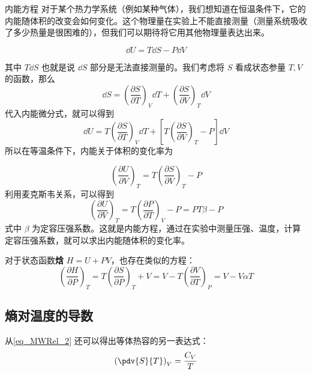 \begin{example}{内能方程}
对于某个热力学系统（例如某种气体），我们想知道在恒温条件下，它的内能随体积的改变会如何变化。这个物理量在实验上不能直接测量（测量系统吸收了多少热量是很困难的），但我们可以期待将它用其他物理量表达出来。

\begin{equation}
\dd U=T\dd S-P\dd V
\end{equation}

其中 $T\dd S$ 也就是说 $\dd S$ 部分是无法直接测量的。我们考虑将 $S$ 看成状态参量 $T,V$ 的函数，那么 
\begin{equation}
\dd S=\left(\frac{\partial S}{\partial T}\right)_V \dd T+\left(\frac{\partial S}{\partial V}\right)_T \dd V
\end{equation}
代入内能微分式，就可以得到
\begin{equation}\label{eq_MWRel_2}
\dd U=T\left(\frac{\partial S}{\partial T}\right)_V\dd T+\left[T\left(\frac{\partial S}{\partial V}\right)_T-P\right]\dd V
\end{equation}
所以在等温条件下，内能关于体积的变化率为

\begin{equation}
\left(\frac{\partial U}{\partial V}\right)_T=T\left(\frac{\partial S}{\partial V}\right)_T-P
\end{equation}
利用麦克斯韦关系，可以得到
\begin{equation}
\left(\frac{\partial U}{\partial V}\right)_T=T\left(\frac{\partial P}{\partial T}\right)_V-P=PT\beta-P
\end{equation}
式中 $\beta$ 为定容压强系数。这就是内能方程，通过在实验中测量压强、温度，计算定容压强系数，就可以求出内能随体积的变化率。

对于状态函数\textbf{焓} $H=U+PV$，也存在类似的方程：
\begin{equation}\label{eq_MWRel_3}
\left(\frac{\partial H}{\partial P}\right)_T=T\left(\frac{\partial S}{\partial P}\right)_T+V
=V-T\left(\frac{\partial V}{\partial T}\right)_P=V-V\alpha T
\end{equation}

\end{example}

\subsection{熵对温度的导数}
从\autoref{eq_MWRel_2} 还可以得出等体热容的另一表达式：
\begin{equation}
\left(\pdv{S}{T}\right)_V=\frac{C_V}{T}
\end{equation}

